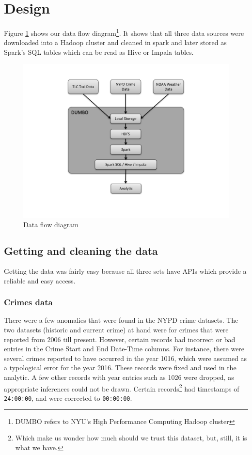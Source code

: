 \documentclass{sigkddExp}
\begin{document}
\section{Design}

Figure \ref{figx} shows our data flow diagram\footnote{DUMBO refers to NYU's High Performance Computing Hadoop cluster}.  It shows that all three data sources were downloaded into a Hadoop cluster and cleaned in spark and later stored as Spark's SQL tables which can be read as Hive or Impala tables.

\begin{figure}
\caption{Data flow diagram}
\label{figx}
\centering \includegraphics[width=.45\textwidth]{images/DesignFlowDiagram.pdf}
\end{figure}


\subsection{Getting and cleaning the data}

Getting the data was fairly easy because all three sets have APIs which provide a reliable and easy access.

\subsubsection{Crimes data}
There were a few anomalies that were found in the NYPD crime datasets. The two datasets (historic and current crime) at hand were for crimes that were reported from 2006 till present. However, certain records had incorrect or bad entries in the Crime Start and End Date-Time columns. For instance, there were several crimes reported to have occurred in the year 1016, which were assumed as a typological error for the year 2016. These records were fixed and used in the analytic. A few other records with year entries such as 1026 were dropped, as appropriate inferences could not be drawn. Certain records\footnote{Which make us wonder how much should we trust this dataset, but, still, it is what we have.} had timestamps of \texttt{24:00:00}, and were corrected to \texttt{00:00:00}.
\end{document}
